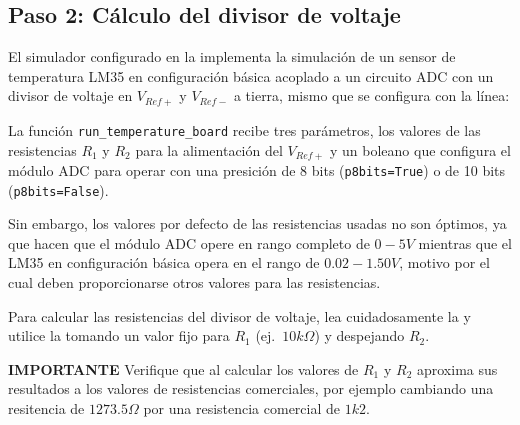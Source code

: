 %
%


\subsection{Paso 2: Cálculo del divisor de voltaje}%
\label{sec:step2}

El simulador configurado en la  implementa la simulación de un sensor de temperatura LM35 en configuración básica acoplado a un circuito ADC con un divisor de voltaje en $V_{Ref+}$ y $V_{Ref-}$ a tierra, mismo que se configura con la línea:



La función \texttt{run\_temperature\_board} recibe tres parámetros, los valores de las resistencias $R_1$ y $R_2$ para la alimentación del $V_{Ref+}$ y un boleano que configura el módulo ADC para operar con una presición de 8 bits (\texttt{p8bits=True}) o de 10 bits  (\texttt{p8bits=False}).

Sin embargo, los valores por defecto de las resistencias usadas no son óptimos, ya que hacen que el módulo ADC opere en rango completo de $0-5V$ mientras que el LM35 en configuración básica opera en el rango de $0.02-1.50V$, motivo por el cual deben proporcionarse otros valores para las resistencias.

Para calcular las resistencias del divisor de voltaje, lea cuidadosamente la  y utilice la  tomando un valor fijo para $R_1$ (ej.~$10k\Omega$) y despejando $R_2$.

\begin{importantbox}{\bfseries IMPORTANTE}
Verifique que al calcular los valores de $R_1$ y $R_2$ aproxima sus resultados a los valores de resistencias comerciales, por ejemplo cambiando una resitencia de $1273.5\Omega$ por una resistencia comercial de $1k2$.
\end{importantbox}